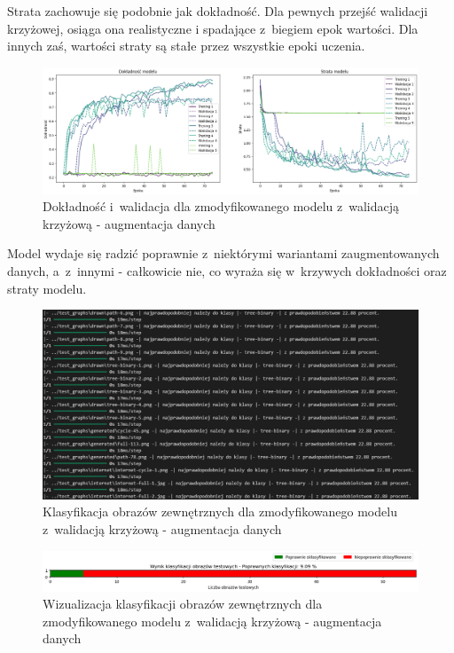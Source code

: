 Strata zachowuje się podobnie jak dokładność. Dla pewnych przejść walidacji krzyżowej, osiąga ona realistyczne
i spadające z~biegiem epok wartości. Dla innych zaś, wartości straty są stałe przez wszystkie epoki uczenia.

\begin{figure}[ht]
	\centering
	\includegraphics[width=15.5cm]{resources/tests/images/v4/crossvalid_3_img.png}
	\caption{Dokładność i~walidacja dla zmodyfikowanego modelu z~walidacją krzyżową - augmentacja danych}
	\label{Fig:tests-cv-3a}
\end{figure}
\FloatBarrier

Model wydaje się radzić poprawnie z~niektórymi wariantami zaugmentowanych danych, a~z~innymi - całkowicie nie,
co wyraża się w~krzywych dokładności oraz straty modelu.

\begin{figure}[ht]
	\centering
	\includegraphics[width=15.5cm]{resources/tests/images/v4/crossvalid_3_txt.png}
	\caption{Klasyfikacja obrazów zewnętrznych dla zmodyfikowanego modelu z~walidacją krzyżową - augmentacja danych}
	\label{Fig:tests-cv-3b}
\end{figure}
\FloatBarrier

\begin{figure}[ht]
	\centering
	\includegraphics[width=15.5cm]{resources/tests/images/v4/crossvalid_3_bar.png}
	\caption{Wizualizacja klasyfikacji obrazów zewnętrznych dla zmodyfikowanego modelu z~walidacją krzyżową - augmentacja danych}
	\label{Fig:tests-cv-3c}
\end{figure}
\FloatBarrier

